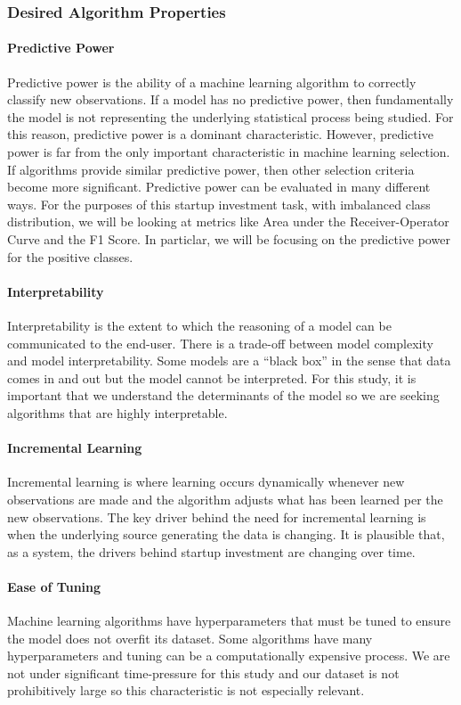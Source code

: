 \documentclass[../thesis/thesis.tex]{subfiles}
\begin{document}
\subsubsection{Desired Algorithm Properties}

\paragraph{Predictive Power}
Predictive power is the ability of a machine learning algorithm to correctly classify new observations. If a model has no predictive power, then fundamentally the model is not representing the underlying statistical process being studied. For this reason, predictive power is a dominant characteristic. However, predictive power is far from the only important characteristic in machine learning selection. If algorithms provide similar predictive power, then other selection criteria become more significant. Predictive power can be evaluated in many different ways. For the purposes of this startup investment task, with imbalanced class distribution, we will be looking at metrics like Area under the Receiver-Operator Curve and the F1 Score. In particlar, we will be focusing on the predictive power for the positive classes.

\paragraph{Interpretability}
Interpretability is the extent to which the reasoning of a model can be communicated to the end-user. There is a trade-off between model complexity and model interpretability. Some models are a ``black box'' in the sense that data comes in and out but the model cannot be interpreted. For this study, it is important that we understand the determinants of the model so we are seeking algorithms that are highly interpretable.

\paragraph{Incremental Learning}
Incremental learning is where learning occurs dynamically whenever new observations are made and the algorithm adjusts what has been learned per the new observations. The key driver behind the need for incremental learning is when the underlying source generating the data is changing. It is plausible that, as a system, the drivers behind startup investment are changing over time.

\paragraph{Ease of Tuning}
Machine learning algorithms have hyperparameters that must be tuned to ensure the model does not overfit its dataset. Some algorithms have many hyperparameters and tuning can be a computationally expensive process. We are not under significant time-pressure for this study and our dataset is not prohibitively large so this characteristic is not especially relevant.
\end{document}
